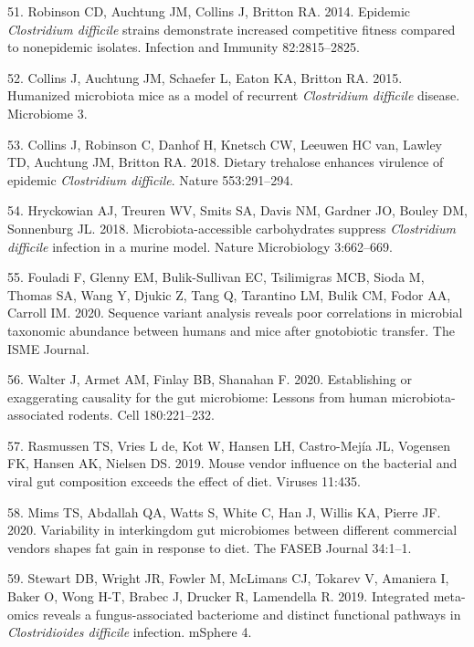 \documentclass[11pt,]{article}
\begin{document}
\hypertarget{ref-Robinson2014}{}
51. Robinson CD, Auchtung JM, Collins J, Britton RA. 2014. Epidemic
\emph{Clostridium difficile} strains demonstrate increased competitive
fitness compared to nonepidemic isolates. Infection and Immunity
82:2815--2825.

\hypertarget{ref-Collins2015}{}
52. Collins J, Auchtung JM, Schaefer L, Eaton KA, Britton RA. 2015.
Humanized microbiota mice as a model of recurrent \emph{Clostridium
difficile} disease. Microbiome 3.

\hypertarget{ref-Collins2018}{}
53. Collins J, Robinson C, Danhof H, Knetsch CW, Leeuwen HC van, Lawley
TD, Auchtung JM, Britton RA. 2018. Dietary trehalose enhances virulence
of epidemic \emph{Clostridium difficile}. Nature 553:291--294.

\hypertarget{ref-Hryckowian2018}{}
54. Hryckowian AJ, Treuren WV, Smits SA, Davis NM, Gardner JO, Bouley
DM, Sonnenburg JL. 2018. Microbiota-accessible carbohydrates suppress
\emph{Clostridium difficile} infection in a murine model. Nature
Microbiology 3:662--669.

\hypertarget{ref-Fouladi2020}{}
55. Fouladi F, Glenny EM, Bulik-Sullivan EC, Tsilimigras MCB, Sioda M,
Thomas SA, Wang Y, Djukic Z, Tang Q, Tarantino LM, Bulik CM, Fodor AA,
Carroll IM. 2020. Sequence variant analysis reveals poor correlations in
microbial taxonomic abundance between humans and mice after gnotobiotic
transfer. The ISME Journal.

\hypertarget{ref-Walter2020}{}
56. Walter J, Armet AM, Finlay BB, Shanahan F. 2020. Establishing or
exaggerating causality for the gut microbiome: Lessons from human
microbiota-associated rodents. Cell 180:221--232.

\hypertarget{ref-Rasmussen2019}{}
57. Rasmussen TS, Vries L de, Kot W, Hansen LH, Castro-Mejía JL,
Vogensen FK, Hansen AK, Nielsen DS. 2019. Mouse vendor influence on the
bacterial and viral gut composition exceeds the effect of diet. Viruses
11:435.

\hypertarget{ref-Mims2020}{}
58. Mims TS, Abdallah QA, Watts S, White C, Han J, Willis KA, Pierre JF.
2020. Variability in interkingdom gut microbiomes between different
commercial vendors shapes fat gain in response to diet. The FASEB
Journal 34:1--1.

\hypertarget{ref-Stewart2019}{}
59. Stewart DB, Wright JR, Fowler M, McLimans CJ, Tokarev V, Amaniera I,
Baker O, Wong H-T, Brabec J, Drucker R, Lamendella R. 2019. Integrated
meta-omics reveals a fungus-associated bacteriome and distinct
functional pathways in \emph{Clostridioides difficile} infection.
mSphere 4.
\end{document}
